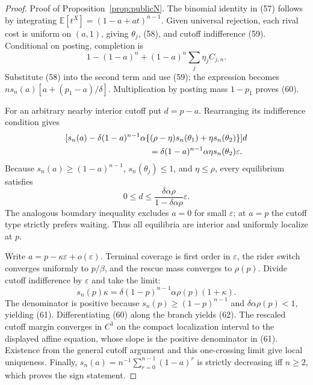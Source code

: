 \documentclass[mnsc,blindrev]{informs3}
\newcommand{\E}{\mathbb E}
\begin{document}
\begin{proof}{Proof of Proposition~\ref{prop:publicN}.}
The binomial identity in (57) follows by integrating
$\E[t^X]=(1-a+at)^{n-1}$.  Given universal rejection, each rival cost is
uniform on $(a,1)$, giving $\theta_j$, (58), and cutoff indifference (59).
Conditional on posting, completion is
\[
 1-(1-a)^n+(1-a)^n\sum_j\eta_j C_{j,n}.
\]
Substitute (58) into the second term and use (59); the expression becomes
$ns_n(a)[a+(p_1-a)/\delta]$.  Multiplication by posting mass $1-p_1$
proves (60).

For an arbitrary nearby interior cutoff put $d=p-a$.  Rearranging its
indifference condition gives
\[
 \begin{aligned}
 &[s_n(a)-\delta(1-a)^{n-1}\alpha\{(\rho-\eta)s_n(\theta_1)
       +\eta s_n(\theta_2)\}]d\\
 &\hspace{35mm}=\delta(1-a)^{n-1}\alpha\eta s_n(\theta_2)
 \varepsilon .
 \end{aligned}
\]
Because $s_n(a)\ge(1-a)^{n-1}$, $s_n(\theta_j)\le1$, and
$\eta\le\rho$, every equilibrium satisfies
\[
 0\le d\le\frac{\delta\alpha\rho}{1-\delta\alpha\rho}\varepsilon.
\]
The analogous boundary inequality excludes $a=0$ for small $\varepsilon$;
at $a=p$ the cutoff type strictly prefers waiting.  Thus all equilibria are
interior and uniformly localize at $p$.

Write $a=p-\kappa\varepsilon+o(\varepsilon)$.  Terminal coverage is first
order in $\varepsilon$, the rider switch converges uniformly to $p/\beta$,
and the rescue mass converges to $\rho(p)$.  Divide cutoff indifference by
$\varepsilon$ and take the limit:
\[
 s_n(p)\kappa
 =\delta(1-p)^{n-1}\alpha\rho(p)(1+\kappa).
\]
The denominator is positive because
$s_n(p)\ge(1-p)^{n-1}$ and $\delta\alpha\rho(p)<1$, yielding (61).
Differentiating (60) along the branch yields (62).  The rescaled cutoff margin converges in
$C^1$ on the compact localization interval to the displayed affine equation,
whose slope is the positive denominator in (61).  Existence from the general
cutoff argument and this one-crossing limit give local uniqueness.  Finally,
$s_n(a)=n^{-1}\sum_{r=0}^{n-1}(1-a)^r$ is strictly decreasing iff $n\ge2$,
which proves the sign statement.
\Halmos\end{proof}
\end{document}
